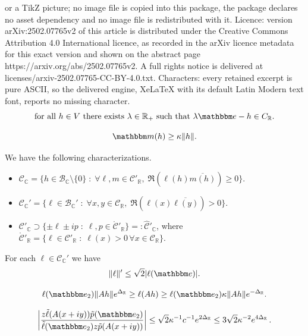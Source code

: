 \documentclass[10pt,a4paper]{amsart}
\newcommand\bC{{\mathbb C}}
\newcommand\bR{{\mathbb R}}
\newcommand\cB{{\mathcal B}}
\newcommand\cC{{\mathcal C}}
\newcommand{\bbe}{\mathbbm e}
\newcommand{\bbm}{\mathbbm m}
\begin{document}
or a TikZ picture; no image file is copied into this package, the package declares no asset dependency and no image file is redistributed with it. Licence: version arXiv:2502.07765v2 of this article is distributed under the Creative Commons Attribution 4.0 International licence, as recorded in the arXiv licence metadata for this exact version and shown on the abstract page https://arxiv.org/abs/2502.07765v2. A full rights notice is delivered at licenses/arxiv-2502.07765-CC-BY-4.0.txt. Characters: every retained excerpt is pure ASCII, so the delivered engine, XeLaTeX with its default Latin Modern text font, reports no missing character.
\begin{equation}
\label{eq:archimedean}
\mbox{for all $h\in  V$ there exists $\lambda\in\bR_+$ such that $\lambda\bbe-h\in C_\bR$.}
\end{equation}  

\begin{equation}\label{eq:maybetoomuch}
\bbm(h)\geq \kappa \|h\|.
\end{equation}

\begin{lem}\label{lem:dual_comp}
We have the following characterizations.
\begin{itemize}
  \item[a)] $\displaystyle \cC_\bC=\{h\in\cB_\bC\setminus\{0\}\;:\; \forall \ell, m\in \cC'_\bR,\; \Re\left(\ell(h)\overline{m(h)}\right)\geq 0\}$.
  \item[b)] $\displaystyle \cC_\bC'=\{ \ell\in \cB_{\bC}'\;:\; \forall x, y\in \cC_\bR,\; \Re(\ell(x)\overline{\ell(y)})>0 \}$. \smallskip
  \item[c)] $\displaystyle \cC'_\bC\supset\{\pm\ell\pm i p\;:\; \ell, p\in \mathring{\cC}'_\bR\}=:\hat\cC'_{\bC}$,
where $\mathring{\cC}'_\bR=\{\ell\in\cC'_{\bR}\;:\; \ell(x)>0 \, \forall x\in\cC_{\bR}\}$.
\end{itemize}
\end{lem}

\begin{lem}\label{lem:upper_dual} For each $\ell\in\cC_{\bC}'$ we have
\[
\|\ell \|' \leq \sqrt 2 |\ell(\bbe)|.
\]
\end{lem}

\begin{equation}\label{eq:up_lower}
\ell(\bbe_2)\|Ah\|e^{\Delta_{\bR}}\geq \ell(Ah)\geq \ell(\bbe_2)\kappa\|Ah\|e^{-\Delta_{\bR}}.
\end{equation}

\begin{equation}
\label{eq:narrow bound}
 \left|\frac{z \tilde\ell(A(x+iy)) \tilde p(\bbe_2)}{\tilde\ell(\bbe_2)z \tilde p(A(x+iy))}\right|\leq \sqrt 2\kappa^{-1}  c^{-1} e^{2\Delta_{\bR}} 
 \le 3\sqrt{2} \kappa^{-2} e^{4 \Delta_\bR} \, . 
\end{equation}
\end{document}

